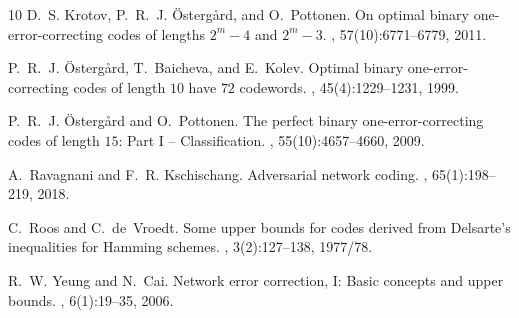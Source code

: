 \documentclass[11pt]{article}
\begin{document}
\begin{thebibliography}{10}
D.~S. Krotov, P.~R.~J. {\"O}sterg{\aa}rd, and O.~Pottonen.
\newblock On optimal binary one-error-correcting codes of lengths $2^m-4$ and
  $2^m-3$.
, 57(10):6771--6779,
  2011.

P.~R.~J. {\"O}sterg{\aa}rd, T.~Baicheva, and E.~Kolev.
\newblock Optimal binary one-error-correcting codes of length $10$ have $72$
  codewords.
, 45(4):1229--1231,
  1999.

P.~R.~J. {\"O}sterg{\aa}rd and O.~Pottonen.
\newblock The perfect binary one-error-correcting codes of length $15 $: Part
  {I} -- {C}lassification.
, 55(10):4657--4660,
  2009.

A.~Ravagnani and F.~R. Kschischang.
\newblock Adversarial network coding.
, 65(1):198--219, 2018.

C.~Roos and C.~de~Vroedt.
\newblock Some upper bounds for codes derived from {D}elsarte's inequalities
  for {H}amming schemes.
, 3(2):127--138, 1977/78.

R.~W. Yeung and N.~Cai.
\newblock Network error correction, {I}: {B}asic concepts and upper bounds.
, 6(1):19--35, 2006.

\end{thebibliography}
\end{document}
